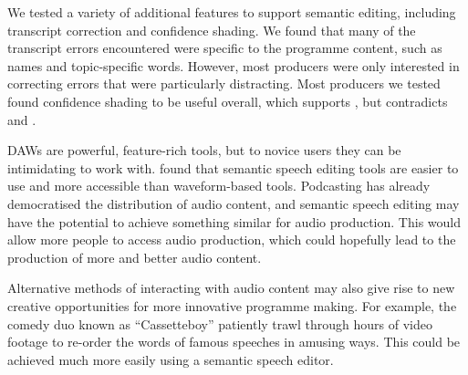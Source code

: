 

We tested a variety of additional features to support semantic editing, including transcript correction and confidence
shading.
We found that many of the transcript errors encountered were specific to the
programme content, such as names and topic-specific words.  However, most producers were only interested in correcting
errors that were particularly distracting.  Most producers we tested found confidence shading to be useful overall,
which supports \citet{Burke2006}, but contradicts \citet{Suhm2001} and \citet{Vemuri2004}.






DAWs are powerful, feature-rich tools, but to novice users they can be intimidating to work with.
\citet{Yoon2014,Sivaraman2016} found that semantic speech editing tools are easier to use and more accessible than
waveform-based tools.  Podcasting has already democratised the distribution of audio content, and semantic speech
editing may have the potential to achieve something similar for audio production. This would allow more people to
access audio production, which could hopefully lead to the production of more and better audio content.

Alternative methods of interacting with audio content may also give rise to new creative opportunities for more
innovative programme making.  For example, the comedy duo known as ``Cassetteboy'' \citep{Perraudin2014} patiently
trawl through hours of video footage to re-order the words of famous speeches in amusing ways. This could be achieved
much more easily using a semantic speech editor.

